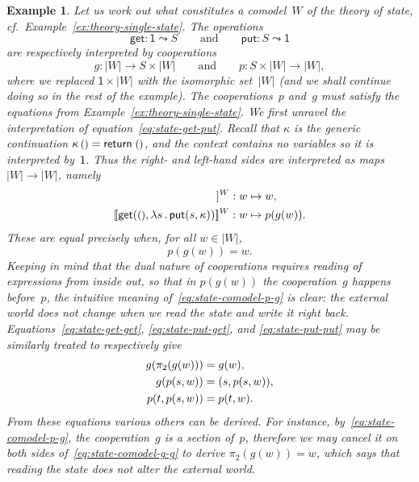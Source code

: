 \documentclass{amsart}
\newcommand{\carrier}[1]{|#1|} %
\newcommand{\lam}[1]{\lambda #1 \,.\,}
\newcommand{\leaf}[1]{\return{#1}} %
\newcommand{\opdecl}[3]{#1 : #2 \leadsto #3} %
\newcommand{\one}{\mathsf{1}} %
\newcommand{\unit}{{\text{\small$()$}}} %
\newcommand{\sem}[1]{[\![#1]\!]} %
\newcommand{\kode}[1]{\mathsf{#1}}
\newcommand{\opcall}[3]{\kode{#1}(#2, #3)}
\newcommand{\return}[1]{\kode{return}\;#1}
\newtheorem{example}{Example}[section]
\begin{document}
\begin{example}
  Let us work out what constitutes a comodel~$W$ of the theory of state, cf.\
  Example~\ref{ex:theory-single-state}. The operations
  \begin{equation*}
    \opdecl{\kode{get}}{\one}{S}
    \qquad\text{and}\qquad
    \opdecl{\kode{put}}{S}{\one}
  \end{equation*}
  are respectively interpreted by cooperations
  \begin{equation*}
    g : \carrier{W} \to S \times \carrier{W}
    \qquad\text{and}\qquad
    p : S \times \carrier{W} \to \carrier{W},
  \end{equation*}
  where we replaced $\one \times \carrier{W}$ with the isomorphic
  set~$\carrier{W}$ (and we shall continue doing so in the rest of the example).
  The cooperations~$p$ and~$g$ must satisfy the equations from
  Example~\ref{ex:theory-single-state}. We first unravel the interpretation of
  equation~\eqref{eq:state-get-put}. Recall that $\kappa$ is the generic
  continuation $\kappa \, \unit = \leaf{\unit}$, and the context contains no variables
  so it is interpreted by~$\one$. Thus the right- and left-hand sides are
  interpreted as maps $\carrier{W} \to \carrier{W}$, namely
  \begin{align*}
    \sem{\kappa\,\unit}^W &: w \mapsto w,\\
    \sem{\opcall{get}{\unit}{\lam{s} \opcall{put}{s}{\kappa}}}^W &: w \mapsto p(g(w)).
  \end{align*}
  These are equal precisely when, for all $w \in |W|$,
  \begin{equation}
    \label{eq:state-comodel-p-g}
    p(g(w)) = w.
  \end{equation}
  Keeping in mind that the dual nature of cooperations requires reading of
  expressions from inside out, so that in $p(g(w))$ the cooperation~$g$ happens
  before~$p$, the intuitive meaning of~\eqref{eq:state-comodel-p-g} is clear:
  the external world does not change when we read the state and write it right
  back. Equations~\eqref{eq:state-get-get}, \eqref{eq:state-put-get}, and
  \eqref{eq:state-put-put} may be similarly treated to respectively give
  \begin{align}
    \label{eq:state-comodel-g-g}
    g(\pi_2 (g (w))) &= g(w),
    \\
    \notag
    g(p(s, w)) &= (s, p (s, w)),
    \\
    \notag
    p(t, p(s, w)) &= p(t, w).
  \end{align}
  From these equations various others can be derived. For instance,
  by~\eqref{eq:state-comodel-p-g}, the cooperation~$g$ is a section of~$p$,
  therefore we may cancel it on both sides of~\eqref{eq:state-comodel-g-g} to
  derive $\pi_2(g(w)) = w$, which says that reading the state does not alter the
  external world.
\end{example}
\end{document}
